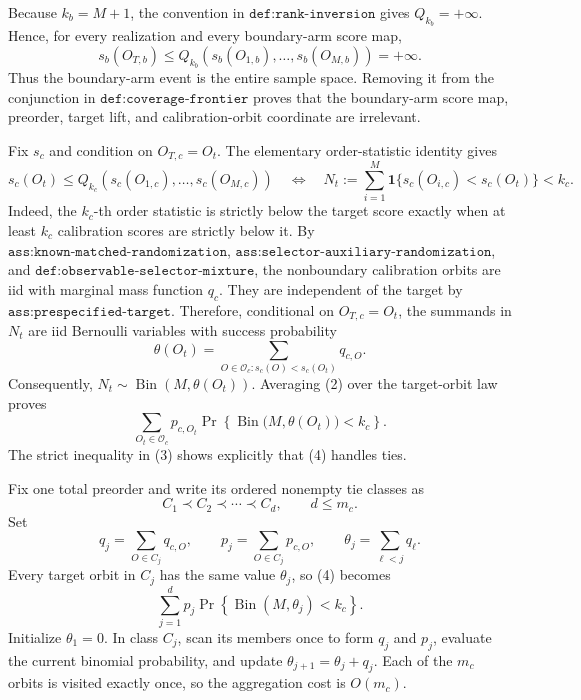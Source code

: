 Because \(k_b=M+1\), the convention in \(\texttt{def:rank-inversion}\) gives \(Q_{k_b}=+\infty\). Hence, for every realization and every boundary-arm score map,
\[
s_b(O_{T,b})\le Q_{k_b}(s_b(O_{1,b}),\ldots,s_b(O_{M,b}))=+\infty.
\tag{1}
\]
Thus the boundary-arm event is the entire sample space. Removing it from the conjunction in \(\texttt{def:coverage-frontier}\) proves that the boundary-arm score map, preorder, target lift, and calibration-orbit coordinate are irrelevant.

Fix \(s_c\) and condition on \(O_{T,c}=O_t\). The elementary order-statistic identity gives
\[
s_c(O_t)\le Q_{k_c}(s_c(O_{1,c}),\ldots,s_c(O_{M,c}))
\quad\Longleftrightarrow\quad
N_t:=\sum_{i=1}^M\mathbf 1\{s_c(O_{i,c})<s_c(O_t)\}<k_c.
\tag{2}
\]
Indeed, the \(k_c\)-th order statistic is strictly below the target score exactly when at least \(k_c\) calibration scores are strictly below it. By \(\texttt{ass:known-matched-randomization}\), \(\texttt{ass:selector-auxiliary-randomization}\), and \(\texttt{def:observable-selector-mixture}\), the nonboundary calibration orbits are iid with marginal mass function \(q_c\). They are independent of the target by \(\texttt{ass:prespecified-target}\). Therefore, conditional on \(O_{T,c}=O_t\), the summands in \(N_t\) are iid Bernoulli variables with success probability
\[
\theta(O_t)=\sum_{O\in\mathcal O_c:s_c(O)<s_c(O_t)}q_{c,O}.
\tag{3}
\]
Consequently, \(N_t\sim\operatorname{Bin}(M,\theta(O_t))\). Averaging (2) over the target-orbit law proves
\[
\sum_{O_t\in\mathcal O_c}p_{c,O_t}
\Pr\!\left\{\operatorname{Bin}\bigl(M,\theta(O_t)\bigr)<k_c\right\}.
\tag{4}
\]
The strict inequality in (3) shows explicitly that (4) handles ties.

Fix one total preorder and write its ordered nonempty tie classes as
\[
C_1\prec C_2\prec\cdots\prec C_d,\qquad d\le m_c.
\]
Set
\[
q_j=\sum_{O\in C_j}q_{c,O},\qquad
p_j=\sum_{O\in C_j}p_{c,O},\qquad
\theta_j=\sum_{\ell<j}q_\ell.
\tag{5}
\]
Every target orbit in \(C_j\) has the same value \(\theta_j\), so (4) becomes
\[
\sum_{j=1}^d p_j\Pr\!\left\{\operatorname{Bin}(M,\theta_j)<k_c\right\}.
\tag{6}
\]
Initialize \(\theta_1=0\). In class \(C_j\), scan its members once to form \(q_j\) and \(p_j\), evaluate the current binomial probability, and update \(\theta_{j+1}=\theta_j+q_j\). Each of the \(m_c\) orbits is visited exactly once, so the aggregation cost is \(O(m_c)\).

